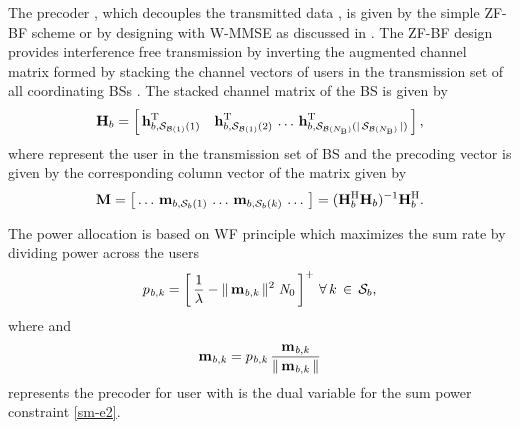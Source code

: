 The precoder , which decouples the transmitted data , is given by the simple \ac{ZF}-\ac{BF} scheme \cite{spencer2004zero} or by designing with \ac{W-MMSE} as discussed in \cite{wmmse_shi}. The \ac{ZF}-\ac{BF} design provides interference free transmission by inverting the augmented channel matrix formed by stacking the channel vectors of users in the transmission set of all coordinating \ac{BS}s . The stacked channel matrix of the \ac{BS}  is given by
\begin{eqnarray}
\mbf{H}_b = \matscont{\mvecnxyz{h}{b}{\mc{S}_{\mc{B}(1)}(1)}^\mrm{T} \quad \mvecnxyz{h}{b}{\mc{S}_{\mc{B}(1)}(2)}^\mrm{T} \, \dotsc \, \mvecnxyz{h}{b}{\mc{S}_{\mc{B}(N_\mrm{B})}(\card{\mc{S}_{\mc{B}(N_\mrm{B})}})}^\mrm{T} }, \label{sm-e3}
\end{eqnarray}
where  represent the  user in the transmission set of  \ac{BS} and the precoding vector  is given by the corresponding column vector of the matrix  given by
\begin{equation}
\mbf{M} = \matscont{\dotsc \, \mvecnxyz{m}{b}{\mc{S}_b(1)} \, \dotsc \, \mvecnxyz{m}{b}{\mc{S}_b(k)} \, \dotsc \,} = (\mbf{H}^\mrm{H}_b \mbf{H}_b)^{-1}\mbf{H}^\mrm{H}_b.
\label{sm-e4}
\end{equation}

The power allocation is based on \ac{WF} principle which maximizes the sum rate by dividing power across the users
\begin{equation}
\msclxyz{p}{b}{k} = \matscont{\frac{1}{\lambda} - \gnorm{\mvecxyz{m}{b}{k}}^2 \; \mtext{N}_{0}}^+ \fall k \inm \mc{S}_b,
\label{sm-e5}
\end{equation}
where  and
\begin{equation}
\mvecxyz{m}{b}{k} = \msclxyz{p}{b}{k} \, \frac{\mvecxyz{m}{b}{k}}{\gnorm{\mvecxyz{m}{b}{k}}}
\label{sm-e6}
\end{equation}
represents the precoder for user  with  is the dual variable for the sum power constraint \eqref{sm-e2}.

